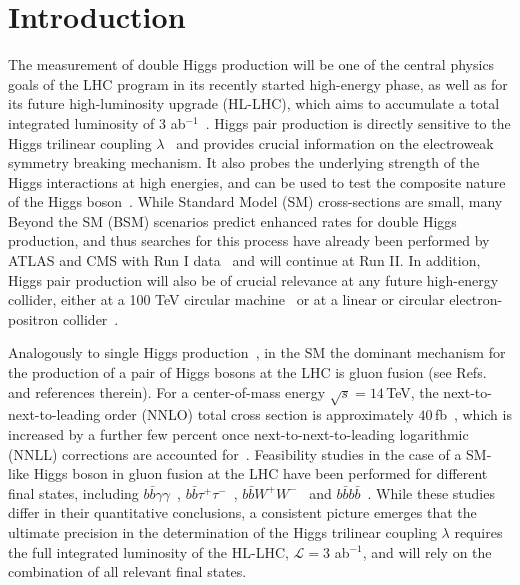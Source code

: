 \section{Introduction}

The measurement of double Higgs production will be one of the central
physics goals of the LHC program in its recently started high-energy
phase, as well as for its future high-luminosity upgrade (HL-LHC),
which aims to accumulate a total integrated
luminosity of 3 ab$^{-1}$~\cite{ATLAS:2013hta,CMS:2013xfa}.
%
Higgs pair production is directly sensitive to the
Higgs trilinear coupling $\lambda$~\cite{baglio} and 
provides crucial
information on the electroweak symmetry breaking mechanism.
%
It also probes the underlying strength of the Higgs interactions
at high energies, and can be used to test the composite nature of the 
Higgs boson~\cite{Giudice:2007fh,Contino:2010mh}.
%
While Standard Model (SM) cross-sections are small,
many Beyond the SM (BSM)
scenarios predict enhanced rates for double Higgs production, and
thus searches for this process have already been performed by ATLAS and CMS with Run I data~\cite{Aad:2015xja,Aad:2015uka,Aad:2014yja,Khachatryan:2015yea,Chatrchyan:2011wt}
and will continue at Run II.
%
In addition, Higgs pair production will also be of
crucial relevance at
any future high-energy 
collider, either at a 100 TeV circular machine~\cite{Arkani-Hamed:2015vfh,Barr:2014sga,Papaefstathiou:2015iba,Azatov:2015oxa} or at
a linear or circular electron-positron collider~\cite{Contino:2013gna}.

Analogously to single Higgs production~\cite{Dittmaier:2012vm}, 
in the SM the dominant mechanism for the production of a pair of
Higgs bosons at the LHC is 
gluon fusion (see Refs.~\cite{baglio,Frederix:2014hta} and
references therein).
%
For a center-of-mass energy $\sqrt{s} = 14\,$TeV, the
next-to-next-to-leading order (NNLO)
total cross section is approximately $40\,$fb~\cite{deFlorian:2013jea},
which is increased by a further few percent once
next-to-next-to-leading logarithmic
(NNLL) corrections
are accounted for~\cite{deFlorian:2015moa}.
%
Feasibility studies in the case of a SM-like Higgs boson
in gluon fusion at the LHC have been performed for different final states, including
$b\bar b\gamma\gamma$~\cite{Baur:2003gp,Barger:2013jfa},
$b\bar{b}\tau^+\tau^-$~\cite{Baur:2003gpa,Barr:2013tda,Dolan:2012rv,Dolan:2013rja},
$b\bar{b}W^+W^-$~\cite{Dolan:2012rv,Papaefstathiou:2012qe} and
$b\bar{b}b\bar{b}$~\cite{Baur:2003gpa,Dolan:2012rv,Wardrope:2014kya,deLima:2014dta,Barger:2013jfa}.
%
While these studies differ in their quantitative conclusions,
a consistent picture emerges 
that the ultimate precision in the determination of the Higgs trilinear
coupling $\lambda$ requires the full integrated luminosity
of the HL-LHC, $\mathcal{L}=3$ ab$^{-1}$,
and will rely on the combination of all relevant final states.


